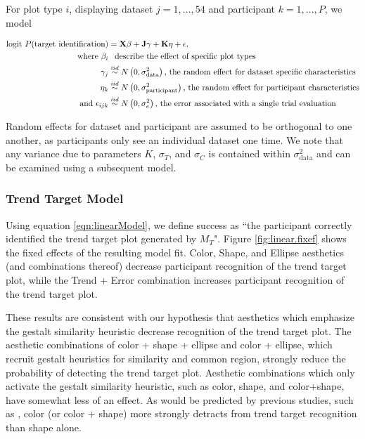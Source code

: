 \documentclass[11pt]{isuthesis}\usepackage[]{graphicx}\usepackage[]{color}
\begin{document}
For plot type $i$, displaying dataset $j=1, ..., 54$ and participant $k=1, ..., P$, we model

\begin{align}
\text{logit }P(\text{target identification}) & =  \textbf{X}\beta + \textbf{J}\gamma + \textbf{K}\eta + \epsilon, \label{eqn:linearModel}\\
\text{where } \beta_i & \hphantom{\sim} \text{describe the effect of specific plot types}\nonumber\\
\hphantom{where } \gamma_j & \overset{iid}{\sim} N\left(0, \sigma^2_{\text{data}}\right)\text{, the random effect for dataset specific characteristics}\nonumber\\
\hphantom{where } \eta_k & \overset{iid}{\sim} N\left(0, \sigma^2_{\text{participant}}\right)\text{, the random effect for participant characteristics}\nonumber\\
\text{and } \epsilon_{ijk} & \overset{iid}{\sim}  N\left(0, \sigma^2_e\right)\text{, the error associated with a single trial evaluation} \nonumber
\end{align}

Random effects for dataset and participant are assumed to be orthogonal to one another, as participants only see an individual dataset one time. We note that any variance due to parameters $K$, $\sigma_T$, and $\sigma_C$ is contained within $\sigma^2_{\text{data}}$ and can be examined using a subsequent model. 

\subsubsection{Trend Target Model}



Using equation \ref{eqn:linearModel}, we define success as ``the participant correctly identified the trend target plot generated by $M_T$". Figure \ref{fig:linear.fixef} shows the fixed effects of the resulting model fit. Color, Shape, and Ellipse aesthetics (and combinations thereof) decrease participant recognition of the trend target plot, while the Trend + Error combination increases participant recognition of the trend target plot.

These results are consistent with our hypothesis that aesthetics which emphasize the gestalt similarity heuristic decrease recognition of the trend target plot. The aesthetic combinations of color + shape + ellipse and color + ellipse, which recruit gestalt heuristics for similarity and common region, strongly reduce the probability of detecting the trend target plot. Aesthetic combinations which only activate the gestalt similarity heuristic, such as color, shape, and color+shape, have somewhat less of an effect. As would be predicted by previous studies, such as \citet{lewandowsky1989discriminating}, color (or color + shape) more strongly detracts from trend target recognition than shape alone. 
\end{document}
